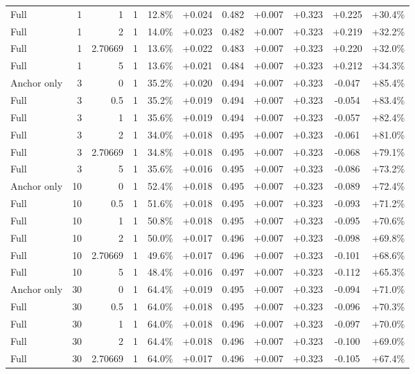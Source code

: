 \begin{table}[htbp]
\begin{tabular}{lrrrccccccc}
Full & 1 & 1 & 1 & 12.8\% & +0.024 & 0.482 & +0.007 & +0.323 & +0.225 & +30.4\% \\
Full & 1 & 2 & 1 & 14.0\% & +0.023 & 0.482 & +0.007 & +0.323 & +0.219 & +32.2\% \\
Full & 1 & 2.70669 & 1 & 13.6\% & +0.022 & 0.483 & +0.007 & +0.323 & +0.220 & +32.0\% \\
Full & 1 & 5 & 1 & 13.6\% & +0.021 & 0.484 & +0.007 & +0.323 & +0.212 & +34.3\% \\
Anchor only & 3 & 0 & 1 & 35.2\% & +0.020 & 0.494 & +0.007 & +0.323 & -0.047 & +85.4\% \\
Full & 3 & 0.5 & 1 & 35.2\% & +0.019 & 0.494 & +0.007 & +0.323 & -0.054 & +83.4\% \\
Full & 3 & 1 & 1 & 35.6\% & +0.019 & 0.494 & +0.007 & +0.323 & -0.057 & +82.4\% \\
Full & 3 & 2 & 1 & 34.0\% & +0.018 & 0.495 & +0.007 & +0.323 & -0.061 & +81.0\% \\
Full & 3 & 2.70669 & 1 & 34.8\% & +0.018 & 0.495 & +0.007 & +0.323 & -0.068 & +79.1\% \\
Full & 3 & 5 & 1 & 35.6\% & +0.016 & 0.495 & +0.007 & +0.323 & -0.086 & +73.2\% \\
Anchor only & 10 & 0 & 1 & 52.4\% & +0.018 & 0.495 & +0.007 & +0.323 & -0.089 & +72.4\% \\
Full & 10 & 0.5 & 1 & 51.6\% & +0.018 & 0.495 & +0.007 & +0.323 & -0.093 & +71.2\% \\
Full & 10 & 1 & 1 & 50.8\% & +0.018 & 0.495 & +0.007 & +0.323 & -0.095 & +70.6\% \\
Full & 10 & 2 & 1 & 50.0\% & +0.017 & 0.496 & +0.007 & +0.323 & -0.098 & +69.8\% \\
Full & 10 & 2.70669 & 1 & 49.6\% & +0.017 & 0.496 & +0.007 & +0.323 & -0.101 & +68.6\% \\
Full & 10 & 5 & 1 & 48.4\% & +0.016 & 0.497 & +0.007 & +0.323 & -0.112 & +65.3\% \\
Anchor only & 30 & 0 & 1 & 64.4\% & +0.019 & 0.495 & +0.007 & +0.323 & -0.094 & +71.0\% \\
Full & 30 & 0.5 & 1 & 64.0\% & +0.018 & 0.495 & +0.007 & +0.323 & -0.096 & +70.3\% \\
Full & 30 & 1 & 1 & 64.0\% & +0.018 & 0.496 & +0.007 & +0.323 & -0.097 & +70.0\% \\
Full & 30 & 2 & 1 & 64.4\% & +0.018 & 0.496 & +0.007 & +0.323 & -0.100 & +69.0\% \\
Full & 30 & 2.70669 & 1 & 64.0\% & +0.017 & 0.496 & +0.007 & +0.323 & -0.105 & +67.4\% \\

\end{tabular}
\end{table}
